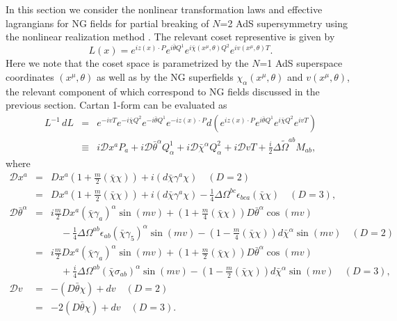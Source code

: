 \documentclass[a4paper,12pt]{article}
\def\btheta{\bar{\theta}}
\def\bchi{\bar{\chi}}
\def\CD{\mathcal{D}}
\begin{document}
In this section we consider the nonlinear transformation laws
and effective lagrangians for NG fields for partial breaking of $N$=2
AdS supersymmetry using the nonlinear
realization method \cite{CWZOg}. 
The relevant coset representive is given by
\begin{equation}
 L(x) = e^{iz(x)\cdot P}e^{i\btheta Q^{1}}
e^{i\bchi(x^{\mu},\theta) Q^{2}}e^{iv(x^{\mu},\theta) T}.
  \label{parl}
\end{equation}
Here we note that the coset space is parametrized by the $N$=1
AdS superspace coordinates $(x^{\mu},\theta)$ as well as by the NG 
superfields $\chi_{\alpha}(x^{\mu},\theta)$ and
$v(x^{\mu},\theta)$, the relevant component of which correspond
to NG fields discussed in the previous section.
Cartan 1-form can be evaluated as
\begin{eqnarray}
 L^{-1}\,dL &=& e^{-ivT}e^{-i\bchi Q^{2}}e^{-i\btheta Q^{1}}e^{-iz(x)\cdot P}
  d\left(e^{iz(x)\cdot P}e^{i\btheta Q^{1}}e^{i\bchi Q^{2}}e^{ivT}\right)
 \nonumber \\
 &\equiv& i\CD x^{a}P_{a} + i\CD\btheta^{\alpha}Q^{1}_{\alpha}
 + i\CD\bchi^{\alpha}Q^{2}_{\alpha} + i\CD vT
 + \frac{i}{2}\mathit{\Delta \tilde{\Omega}}^{ab}M_{ab},
 \label{parcartandef}
\end{eqnarray}
where 
\begin{eqnarray}
 \CD x^{a} &=&
	 Dx^{a}\left(1+\frac{m}{2}(\bchi\chi)\right)+ i(d\bchi\gamma^{a}\chi)
	\quad (D=2) \nonumber \\
	&=& 
	Dx^{a}\left(1+\frac{m}{2}(\bchi\chi)\right)+ i(d\bchi\gamma^{a}\chi)
	 -\frac{1}{4}\mathit{\Delta\Omega}^{bc}\epsilon_{bca}(\bchi\chi)
	\quad (D=3), \nonumber \\
 \CD \btheta^{\alpha}
  &=& i\frac{m}{2}Dx^{a}(\bchi\gamma_{a})^{\alpha}\sin{(mv)}
  + \left(1+\frac{m}{4}(\bchi\chi)\right)D\btheta^{\alpha}\cos{(mv)} 
  \nonumber \\
 & & \quad {} - \frac{1}{4}\mathit{\Delta}\Omega^{ab}\epsilon_{ab}
  (\bchi\gamma_{5})^{\alpha}\sin{(mv)}
  - \left(1-\frac{m}{4}(\bchi\chi)\right)d\bchi^{\alpha}\sin{(mv)}
   \quad (D=2) \nonumber\\
  &=& i\frac{m}{2}Dx^{a}(\bchi\gamma_{a})^{\alpha}\sin{(mv)}
	+ \left(1+\frac{m}{2}(\bchi\chi)\right)D\btheta^{\alpha}\cos{(mv)}
	\nonumber \\
  & & \quad {} + \frac{i}{4}\mathit{\Delta}\Omega^{ab}
  (\bchi\sigma_{ab})^{\alpha}\sin{(mv)}
	- \left(1-\frac{m}{2}(\bchi\chi)\right)d\bchi^{\alpha}\sin{(mv)}
	\quad (D=3), \nonumber \\
  \CD v &=& -(D\btheta\chi) + dv \quad (D=2) \nonumber \\
	&=& -2(D\btheta\chi) + dv \quad (D=3). 
\end{eqnarray}
\end{document}
